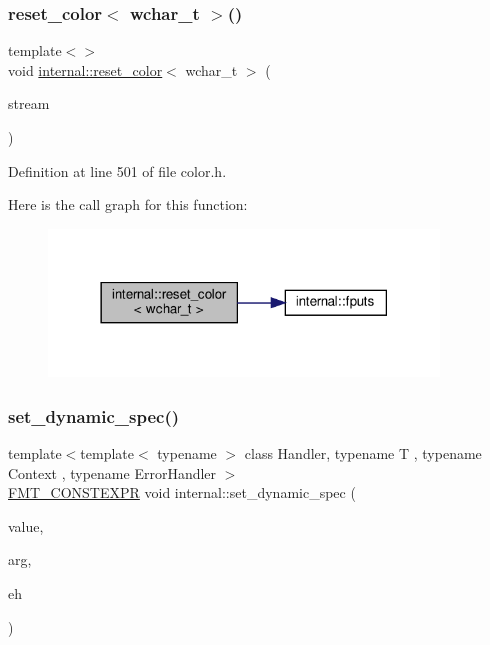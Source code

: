 \subsubsection{\texorpdfstring{reset\+\_\+color$<$ wchar\+\_\+t $>$()}{reset\_color< wchar\_t >()}}
{\footnotesize\ttfamily template$<$$>$ \\
void \hyperlink{namespaceinternal_aef3df5de8950cb056b5f412ba9e8033f}{internal\+::reset\+\_\+color}$<$ wchar\+\_\+t $>$ (\begin{DoxyParamCaption}\item[{F\+I\+LE $\ast$}]{stream }\end{DoxyParamCaption})\hspace{0.3cm}{\ttfamily [inline]}}



Definition at line 501 of file color.\+h.

Here is the call graph for this function\+:
\nopagebreak
\begin{figure}[H]
\begin{center}
\leavevmode
\includegraphics[width=294pt]{namespaceinternal_a90b9a62d1536ba128a175690641f32d4_cgraph}
\end{center}
\end{figure}
\mbox{\label{namespaceinternal_aa85eeb6162dd6a5dcc6b8416d9bba83c}} 
\subsubsection{\texorpdfstring{set\+\_\+dynamic\+\_\+spec()}{set\_dynamic\_spec()}}
{\footnotesize\ttfamily template$<$template$<$ typename $>$ class Handler, typename T , typename Context , typename Error\+Handler $>$ \\
\hyperlink{core_8h_a69201cb276383873487bf68b4ef8b4cd}{F\+M\+T\+\_\+\+C\+O\+N\+S\+T\+E\+X\+PR} void internal\+::set\+\_\+dynamic\+\_\+spec (\begin{DoxyParamCaption}\item[{T \&}]{value,  }\item[{\hyperlink{classbasic__format__arg}{basic\+\_\+format\+\_\+arg}$<$ Context $>$}]{arg,  }\item[{Error\+Handler}]{eh }\end{DoxyParamCaption})}



